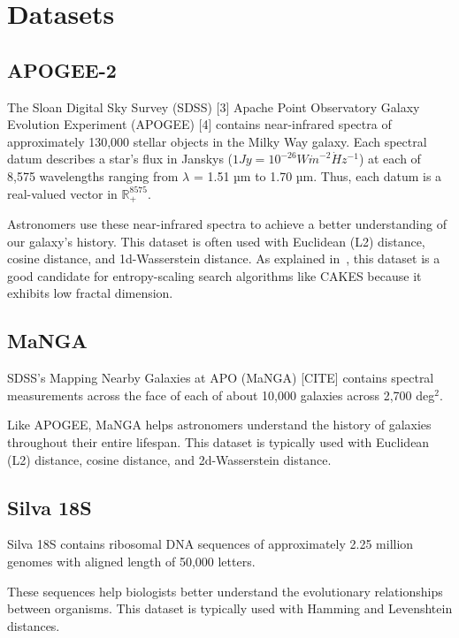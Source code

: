 
\section{Datasets}
\label{sec:datasets-and-distance-functions}

\subsection{APOGEE-2}
\label{subsec:datasets:apogee-2}
The Sloan Digital Sky Survey (SDSS) [3] Apache Point Observatory Galaxy Evolution
Experiment (APOGEE) [4] contains near-infrared
spectra of approximately 130,000 stellar objects in the Milky
Way galaxy. Each spectral datum describes a star's flux in
Janskys ($1 Jy = 10^{-26} W \dot m^{-2} \dot Hz^{-1}$) at each of 8,575 wavelengths ranging from $\lambda$ = 1.51 µm to 1.70 µm. 
Thus, each datum is a real-valued vector in $\mathbb{R}_{+}^{8575}$. 

Astronomers use these near-infrared spectra to achieve a better understanding of our galaxy's history. This dataset 
is often used with Euclidean (L2) distance, cosine distance, and 1d-Wasserstein distance. As explained in~\cite{ishaq2019clustered},
this dataset is a good candidate for entropy-scaling search algorithms like CAKES because it exhibits low fractal dimension. 

\subsection{MaNGA}
\label{subsec:datasets:manga}
SDSS's Mapping Nearby Galaxies at APO (MaNGA) [CITE] contains spectral measurements across the face of each of 
about 10,000 galaxies across 2,700 deg$^2$. 

Like APOGEE, MaNGA helps astronomers understand the history of galaxies throughout their entire lifespan. This 
dataset is typically used with Euclidean (L2) distance, cosine distance, and 2d-Wasserstein distance. 


\subsection{Silva 18S}
\label{subsec:datasets:silva-18s}

Silva 18S contains ribosomal DNA sequences of approximately 2.25 
million genomes with aligned length of 50,000 letters. 


These sequences help biologists better understand the evolutionary relationships between organisms. 
This dataset is typically used with Hamming and Levenshtein distances. 


